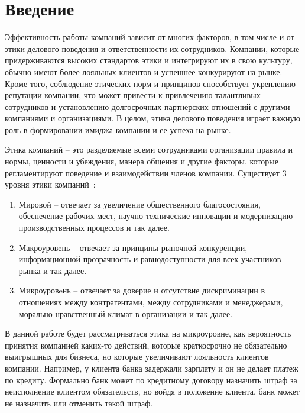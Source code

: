 \documentclass{article}
\begin{document}
\maketitle

\chapter*{Введение}
\label{sec:org4445a4e}
Эффективность работы компаний зависит от многих факторов, в том числе и от этики делового поведения и ответственности их сотрудников. Компании, которые придерживаются высоких стандартов этики и интегрируют их в свою культуру, обычно имеют более лояльных клиентов и успешнее конкурируют на рынке. Кроме того, соблюдение этических норм и принципов способствует укреплению репутации компании, что может привести к привлечению талантливых сотрудников и установлению долгосрочных партнерских отношений с другими компаниями и организациями. В целом, этика делового поведения играет важную роль в формировании имиджа компании и ее успеха на рынке.

Этика компаний – это разделяемые всеми сотрудниками организации правила и нормы, ценности и убеждения, манера общения и другие факторы, которые регламентируют поведение и взаимодействии членов компании. Существует 3 уровня этики компаний~\autocite{smirnova_biznesetika_2021}:
\begin{enumerate}
\item Мировой -- отвечает за увеличение общественного благосостояния, обеспечение рабочих мест, научно-технические инновации и модернизацию производственных процессов и так далее.
\item Макроуровень -- отвечает за принципы рыночной конкуренции, информационной прозрачность и равнодоступности для всех участников рынка и так далее.
\item Микроуровeнь -- отвечает за доверие и отсутствие дискриминации в отношениях между контрагентами, между сотрудниками и менеджерами, морально-нравственный климат в организации и так далее.
\end{enumerate}

В данной работе будет рассматриваться этика на микроуровне, как вероятность принятия компанией каких-то действий, которые краткосрочно не обязательно выигрышных для бизнеса, но которые увеличивают лояльность клиентов компании. Например, у клиента банка задержали зарплату и он не делает платеж по кредиту. Формально банк может по кредитному договору назначить штраф за неисполнение клиентом обязательств, но войдя в положение клиента, банк может не назначить или отменить такой штраф.
\end{document}
